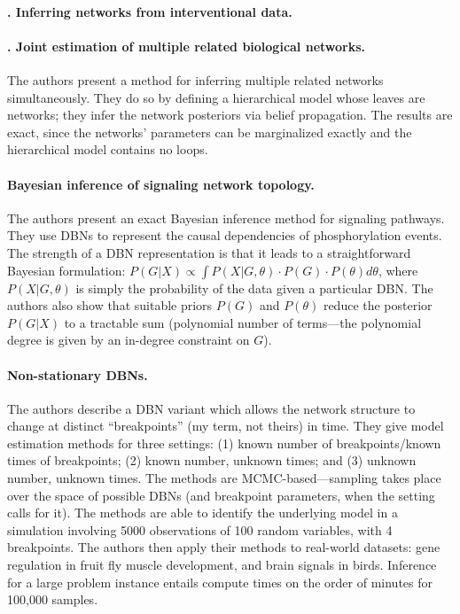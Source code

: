 \documentclass[14pt]{article}
\begin{document}
\paragraph{ \citet{2015-spencer-interventional}. Inferring networks from interventional data.}

\paragraph{ \citet{2014-oates-joint}. Joint estimation of multiple related biological networks.}
The authors present a method for inferring multiple related networks simultaneously.
They do so by defining a hierarchical model whose leaves are networks;
they infer the network posteriors via belief propagation.
The results are exact, since the networks' parameters can be marginalized exactly and the hierarchical model contains no loops. 

\paragraph{ \citet{hill-bayesian-2012} Bayesian inference of signaling network topology.}
The authors present an exact Bayesian inference method for signaling pathways.
They use DBNs to represent the causal dependencies of phosphorylation events.
The strength of a DBN representation is that it leads to a straightforward Bayesian formulation:
$P(G|X) \propto \int P(X|G, \theta) \cdot P(G) \cdot P(\theta) d\theta$, where $P(X|G, \theta)$ is
simply the probability of the data given a particular DBN.
The authors also show that suitable priors $P(G)$ and $P(\theta)$ reduce the posterior $P(G|X)$
to a tractable sum (polynomial number of terms---the polynomial degree is given by an in-degree constraint on $G$).

\paragraph{ \citet{2010-robinson-nsdbn} Non-stationary DBNs.}
The authors describe a DBN variant which allows the network structure
to change at distinct ``breakpoints'' (my term, not theirs) in time.
They give model estimation methods for three settings: (1) known number of breakpoints/known times of breakpoints; (2) known number, unknown times; and (3) unknown number, unknown times.
The methods are MCMC-based---sampling takes place over the space of possible DBNs (and breakpoint parameters, when the setting calls for it).
The methods are able to identify the underlying model in a simulation involving 5000 observations of 100 random variables, with 4 breakpoints.
The authors then apply their methods to real-world datasets: gene regulation in fruit fly muscle development, and brain signals in birds.
Inference for a large problem instance entails compute times on the order of minutes for 100,000 samples.
\end{document}
